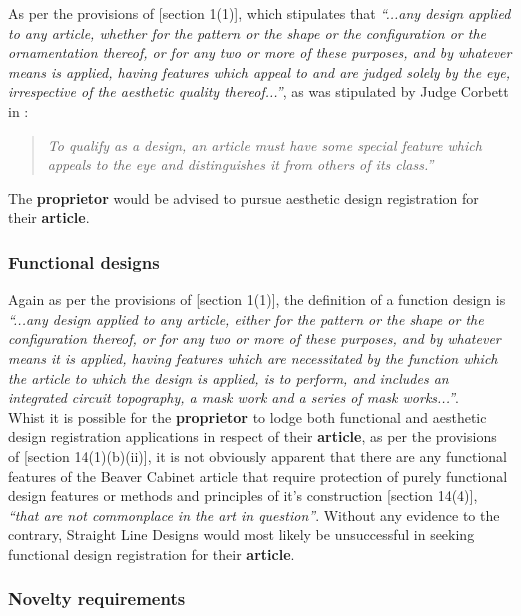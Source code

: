 \documentclass[11pt]{article}
\begin{document}
As per the provisions of [section 1(1)]\cite{rsa93_designs_act}, which stipulates
that \textit{``...any design applied to any article, whether for the
pattern or the shape or the configuration or the ornamentation thereof, or for
any two or more of these purposes, and by whatever means is applied, having
features which appeal to and are judged solely by the eye, irrespective of the
aesthetic quality thereof...''}, as was stipulated by Judge Corbett in
:
\begin{quote}
\textit{To qualify as a design, an article must have some special feature
which appeals to the eye and distinguishes it from others of its class.''}
\end{quote}
The \textbf{proprietor} would be advised to pursue aesthetic design registration for
their \textbf{article}.

\subsubsection{Functional designs}
\label{sec:orgf38ba0c}
Again as per the provisions of [section 1(1)]\cite{rsa93_designs_act}, the
definition of a function design is \textit{``...any design applied to any article,
either for the pattern or the shape or the configuration thereof, or for any two
or more of these purposes, and by whatever means it is applied, having features
which are necessitated by the function which the article to which the design is
applied, is to perform, and includes an integrated circuit topography, a mask
work and a series of mask works...''}.\\

Whist it is possible for the \textbf{proprietor} to lodge both functional and aesthetic
design registration applications in respect of their \textbf{article}, as per the
provisions of [section 14(1)(b)(ii)]\cite{rsa93_designs_act}, it is not obviously
apparent that there are any functional features of the Beaver Cabinet article
that require protection of purely functional design features or methods and
principles of it's construction [section 14(4)]\cite{rsa93_designs_act}, \emph{``that
are not commonplace in the art in question''}. Without any evidence to the
contrary, Straight Line Designs would most likely be unsuccessful in seeking
functional design registration for their \textbf{article}.

\subsubsection{Novelty requirements}
\label{sec:org6986516}
\end{document}
